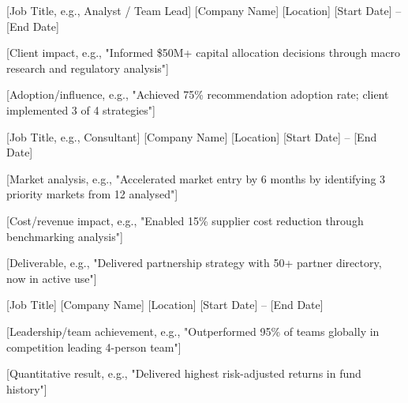 

\begin{cventries}

  \cventry
    {[Job Title, e.g., Analyst / Team Lead]} %
    {[Company Name]} %
    {[Location]} %
    {[Start Date] -- [End Date]} %
    {
      \begin{cvitems}
        \item {[Client impact, e.g., "Informed \$50M+ capital allocation decisions through macro research and regulatory analysis"]}
        \item {[Adoption/influence, e.g., "Achieved 75\% recommendation adoption rate; client implemented 3 of 4 strategies"]}
      \end{cvitems}
    }

  \cventry
    {[Job Title, e.g., Consultant]} %
    {[Company Name]} %
    {[Location]} %
    {[Start Date] -- [End Date]} %
    {
      \begin{cvitems}
        \item {[Market analysis, e.g., "Accelerated market entry by 6 months by identifying 3 priority markets from 12 analysed"]}
        \item {[Cost/revenue impact, e.g., "Enabled 15\% supplier cost reduction through benchmarking analysis"]}
        \item {[Deliverable, e.g., "Delivered partnership strategy with 50+ partner directory, now in active use"]}
      \end{cvitems}
    }

  \cventry
    {[Job Title]} %
    {[Company Name]} %
    {[Location]} %
    {[Start Date] -- [End Date]} %
    {
      \begin{cvitems}
        \item {[Leadership/team achievement, e.g., "Outperformed 95\% of teams globally in competition leading 4-person team"]}
        \item {[Quantitative result, e.g., "Delivered highest risk-adjusted returns in fund history"]}
      \end{cvitems}
    }

\end{cventries}
